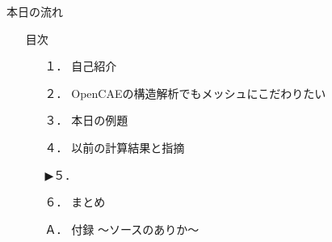\begin{frame}{本日の流れ}
  \begin{itemize}
      \item[] 目次
    \begin{enumerate}[label=\textbf{ \arabic*.},itemsep=1.3ex, leftmargin=1cm]
        \item[１．] 自己紹介
        \item[２．] OpenCAEの構造解析でもメッシュにこだわりたい
        \item[３．] 本日の例題
        \item[４．] 以前の計算結果と指摘
        \item[▶５．] 
        \item[６．] まとめ
        \item[Ａ．] 付録 ～ソースのありか～
    \end{enumerate}
  \end{itemize}
\end{frame}
